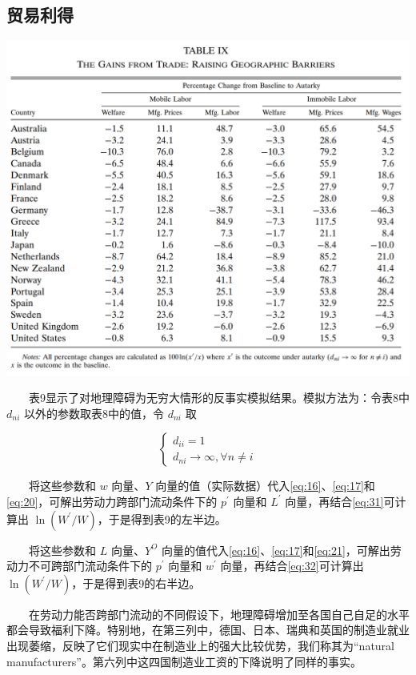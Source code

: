 \documentclass[
]{article}
\begin{document}
\hypertarget{ux8d38ux6613ux5229ux5f97}{%
\subsection{贸易利得}\label{ux8d38ux6613ux5229ux5f97}}

\begin{center}\includegraphics[width=1\linewidth]{Figures/Table9} \end{center}

　　表9显示了对地理障碍为无穷大情形的反事实模拟结果。模拟方法为：令表8中 \(d_{ni}\) 以外的参数取表8中的值，令 \(d_{ni}\) 取

\[
\left\{\begin{array}{c}{d_{i i}=1} \\ {d_{n i}\rightarrow \infty, \forall n \neq i}\end{array}\right.
\]

　　将这些参数和 \(w\) 向量、\(Y\) 向量的值（实际数据）代入\eqref{eq:16}、\eqref{eq:17}和\eqref{eq:20}，可解出劳动力跨部门流动条件下的 \(p^{\prime}\) 向量和 \(L^{\prime}\) 向量，再结合\eqref{eq:31}可计算出 \(\ln \left(W^{\prime}/W\right)\)，于是得到表9的左半边。

　　将这些参数和 \(L\) 向量、\(Y^O\) 向量的值代入\eqref{eq:16}、\eqref{eq:17}和\eqref{eq:21}，可解出劳动力不可跨部门流动条件下的 \(p^{\prime}\) 向量和 \(w^{\prime}\) 向量，再结合\eqref{eq:32}可计算出 \(\ln \left(W^{\prime}/W\right)\)，于是得到表9的右半边。

　　在劳动力能否跨部门流动的不同假设下，地理障碍增加至各国自己自足的水平都会导致福利下降。特别地，在第三列中，德国、日本、瑞典和英国的制造业就业出现萎缩，反映了它们现实中在制造业上的强大比较优势，我们称其为``natural manufacturers''。第六列中这四国制造业工资的下降说明了同样的事实。
\end{document}
